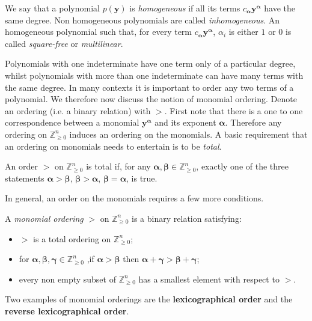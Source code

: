 \begin{definition}
We say that a polynomial $p(\bm{y})$ is \emph{homogeneous} if all its terms $c_{\bm{\alpha}}\bm{y}^{\bm{\alpha}}$ have the same degree. Non homogeneous polynomials are called \emph{inhomogeneous}. An homogeneous polynomial such that, for every term $c_{\bm{\alpha}}\bm{y}^{\bm{\alpha}}$, $\alpha_i$ is either $1$ or $0$ is called \emph{square-free} or \emph{multilinear}.
\end{definition}

Polynomials with one indeterminate have one term only of a particular degree, whilst polynomials with more than one indeterminate can have many terms with the same degree. In many contexts it is important to order any two terms of a polynomial. We therefore now discuss the notion of monomial ordering.  Denote an ordering (i.e. a binary relation) with $>$. First note that there is a one to one correspondence between a monomial $\bm{y}^{\bm{\alpha}}$ and its exponent $\bm{\alpha}$. Therefore any ordering on $\mathbb{Z}^n_{\geq 0}$ induces an ordering on the monomials. A basic requirement that an ordering on monomials needs to entertain is to be \textit{total}.

\begin{definition}
An order $>$ on $\mathbb{Z}_{\geq 0}^n$ is total if, for any $\bm{\alpha},\bm{\beta}\in\mathbb{Z}_{\geq 0}^n$, exactly one of the three statements 
$\bm{\alpha}>\bm{\beta}$,  $\bm{\beta}>\bm{\alpha}$, $ \bm{\beta}=\bm{\alpha}$,
is true.
\end{definition}

In general, an order on the monomials requires a few more conditions.

\begin{definition}
A \emph{monomial ordering} $>$ on $\mathbb{Z}_{\geq 0}^n$ is a binary relation satisfying:
\begin{itemize}
\item $>$ is a total ordering on $\mathbb{Z}_{\geq 0}^n$;
\item for $\bm{\alpha}, \bm{\beta}, \bm{\gamma}\in\mathbb{Z}_{\geq 0}^n$ ,if $\bm{\alpha}>\bm{\beta}$ then $\bm{\alpha}+\bm{\gamma}>\bm{\beta}+\bm{\gamma}$;
\item every non empty subset of $\mathbb{Z}_{\geq 0}^n$ has a smallest element with respect to $>$.
\end{itemize}
\end{definition}

Two examples of  monomial orderings are the \textbf{lexicographical order} and the \textbf{reverse lexicographical order}. 

